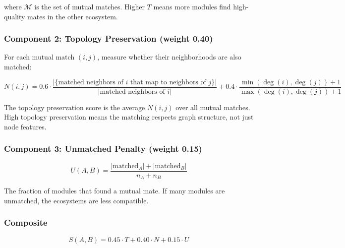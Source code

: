 \documentclass{../yalumba}
\begin{document}
where $\mathcal{M}$ is the set of mutual matches.  Higher $T$ means more
modules find high-quality mates in the other ecosystem.

\subsubsection{Component 2: Topology Preservation (weight 0.40)}

For each mutual match $(i, j)$, measure whether their neighborhoods are
also matched:

\begin{equation}
  N(i, j) = 0.6 \cdot \frac{|\{\text{matched neighbors of } i \text{ that map to neighbors of } j\}|}
                              {|\text{matched neighbors of } i|}
           + 0.4 \cdot \frac{\min(\deg(i), \deg(j)) + 1}
                             {\max(\deg(i), \deg(j)) + 1}
  \label{eq:topology}
\end{equation}

The topology preservation score is the average $N(i,j)$ over all mutual
matches.  High topology preservation means the matching respects graph
structure, not just node features.


\subsubsection{Component 3: Unmatched Penalty (weight 0.15)}

\begin{equation}
  U(A, B) = \frac{|\text{matched}_A| + |\text{matched}_B|}{n_A + n_B}
  \label{eq:unmatched}
\end{equation}

The fraction of modules that found a mutual mate.  If many modules are
unmatched, the ecosystems are less compatible.

\subsubsection{Composite}

\begin{equation}
  S(A, B) = 0.45 \cdot T + 0.40 \cdot N + 0.15 \cdot U
  \label{eq:composite}
\end{equation}


\end{document}

